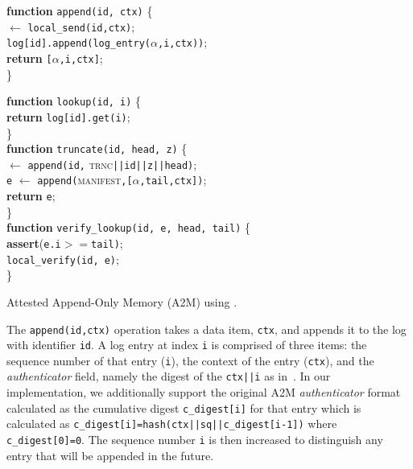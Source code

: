 \begin{algorithm}
\SetAlgoLined
\small
\textbf{function} \texttt{append(id, ctx)} \{ \\
 $\leftarrow$ \texttt{local\_send(id,ctx)};\\
 \texttt{log[id].append(log\_entry($\alpha$,\texttt{i},\texttt{ctx}))};\\
 {\bf return} \texttt{[$\alpha$,\texttt{i},\texttt{ctx}]};\\
\Indm
\} \\

\vspace{0.15cm}

\textbf{function} \texttt{lookup(id, i)} \{ \\
\Indp
    {\bf return} \texttt{log[id].get(i)};\\
\Indm
\} \\
\vspace{0.15cm}
\textbf{function} \texttt{truncate(id, head, z)} \{ \\
 $\leftarrow$ \texttt{append(id,} \textsc{trnc}\texttt{||id||z||head)};\\
        
    \texttt{e} $\leftarrow$ \texttt{append(}\textsc{manifest}\texttt{,[$\alpha$,\texttt{tail},\texttt{ctx}])};\\
    {\bf return} \texttt{e};\\
\Indm
\} \\

\vspace{0.15cm}
\textbf{function} \texttt{verify\_lookup(id, e, head, tail)} \{ \\
\Indp
    \textbf{assert}(\texttt{e.i}$>=$\texttt{tail)};\\
    \texttt{local\_verify(id, e)};\\
\Indm
\} \\
\vspace{-1pt}
\caption{Attested Append-Only Memory (A2M) using \projecttitle{}.}
\label{algo:tnic_log}
\end{algorithm}

 The \texttt{append(id,ctx)} operation takes a data item, \texttt{ctx}, and appends it to the log with identifier \texttt{id}. A log entry at index \texttt{i} is comprised of three items: the sequence number of that entry (\texttt{i}), the context of the entry (\texttt{ctx}), and the {\em authenticator} field, namely the digest of the \texttt{ctx||i} as in~\cite{levin2009trinc}. In our implementation, we additionally support the original A2M {\em authenticator} format calculated as the cumulative digest \texttt{c\_digest[i]} for that entry which is calculated as \texttt{c\_digest[i]=hash(ctx||sq||c\_digest[i-1])} where \texttt{c\_digest[0]=0}. The sequence number \texttt{i} is then increased to distinguish any entry that will be appended in the future. %





